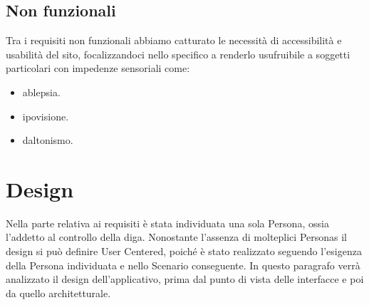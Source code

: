 \documentclass[a4paper,12pt]{report}
\begin{document}
\section{Non funzionali}
Tra i requisiti non funzionali abbiamo catturato le necessità di accessibilità e usabilità del sito, focalizzandoci nello specifico a renderlo usufruibile a soggetti particolari con impedenze sensoriali come:
\begin{itemize}
	\item ablepsia.
	\item ipovisione.
	\item daltonismo.
\end{itemize}

\clearpage
\chapter{Design}\label{sec:design}
Nella parte relativa ai requisiti è stata individuata una sola Persona, ossia l'addetto al controllo della diga. Nonostante l'assenza di molteplici Personas il design si può definire User Centered, poiché è stato realizzato seguendo l'esigenza della Persona individuata e nello Scenario conseguente. In questo paragrafo verrà analizzato il design dell'applicativo, prima dal punto di vista delle interfacce e poi da quello architetturale.
\end{document}
